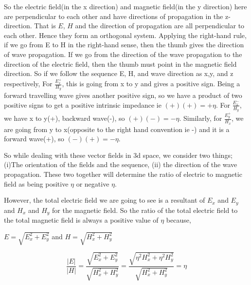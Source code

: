 So the electric field(in the x direction) and magnetic field(in the y direction) here are perpendicular to each other and have directions of propagation in the z-direction. That is $E$, $H$ and the direction of propagation are all perpendicular to each other. Hence they form an orthogonal system. Applying the right-hand rule, if we go from E to H in the right-hand sense, then the thumb gives the direction of wave propagation. If we go from the direction of the wave propagation to the direction of the electric field, then the thumb must point in the magnetic field direction.
So if we follow the sequence E, H, and wave direction as x,y, and z respectively, For $\frac{E_x^+}{H_y}$, this is going from x to y and gives a positive sign. Being a forward travelling wave gives another positive sign, so we have a product of two positive signs to get a positive intrinsic impedance ie $(+)(+) = +\eta$. For $\frac{E_x^-}{H_y}$, we have x to y(+), backward wave(-), so $(+)(-) = -\eta$. Similarly, for $\frac{E_y^+}{H_x}$, we are going from y to x(opposite to the right hand convention ie -) and it is a forward wave(+), so $(-)(+) = -\eta$.

So while dealing with these vector fields in 3d space, we consider two things; (i)The orientation of the fields and the sequence, (ii) the direction of the wave propagation. These two together will determine the ratio of electric to magnetic field as being positive $\eta$ or negative $\eta$.

However, the total electric field we are going to see is a resultant of $E_x$ and $E_y$ and $H_x$ and $H_y$ for the magnetic field. So the ratio of the total electric field to the total magnetic field is always a positive value of $\eta$ because,
\begin{center}
$E = \sqrt{E_x^2 + E_y^2}$ and $H = \sqrt{H_x^2 + H_y^2}$
\end{center}
\begin{dmath*}
\frac{|E|}{|H|}=\frac{\sqrt{E_x^2 + E_y^2}}{\sqrt{H_x^2 + H_y^2}} = \frac{\sqrt{\eta ^2H_x^2 + \eta ^2H_y^2}}{\sqrt{H_x^2 + H_y^2}}=\eta
\end{dmath*}

